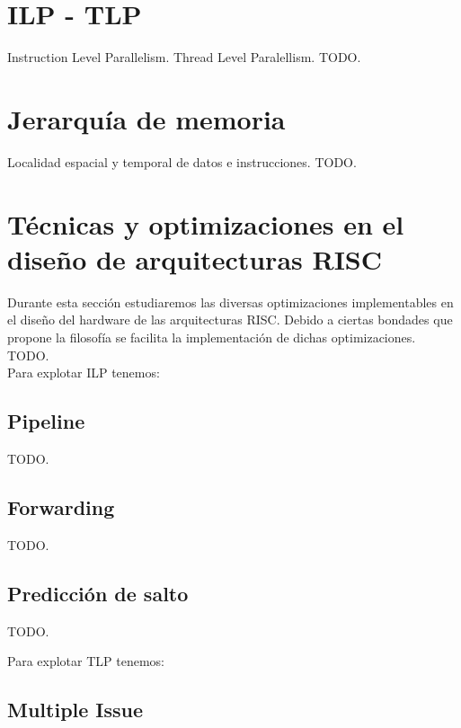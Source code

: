 \section{ILP - TLP}
\label{sec:ilp_tlp}

Instruction Level Parallelism. Thread Level Paralellism. TODO.

\section{Jerarquía de memoria}
\label{sec:mem_hierarchy}

Localidad espacial y temporal de datos e instrucciones. TODO.

\section{Técnicas y optimizaciones en el diseño de arquitecturas RISC}
\label{sec:optimizations}

Durante esta sección estudiaremos las diversas optimizaciones implementables en 
el diseño del hardware de las arquitecturas RISC. Debido a ciertas bondades que 
propone la filosofía se facilita la implementación de dichas optimizaciones. 
TODO.\\

Para explotar ILP tenemos:
\subsection{Pipeline}
\label{subsec:optimizations-pipeline}

TODO.

\subsection{Forwarding}
\label{subsec:optimizations-forwarding}

TODO.

\subsection{Predicción de salto}
\label{subsec:optimizations-branch_prediction}

TODO.

Para explotar TLP tenemos:
\subsection{Multiple Issue}
\label{subsec:optimizations-multiple_issue}

